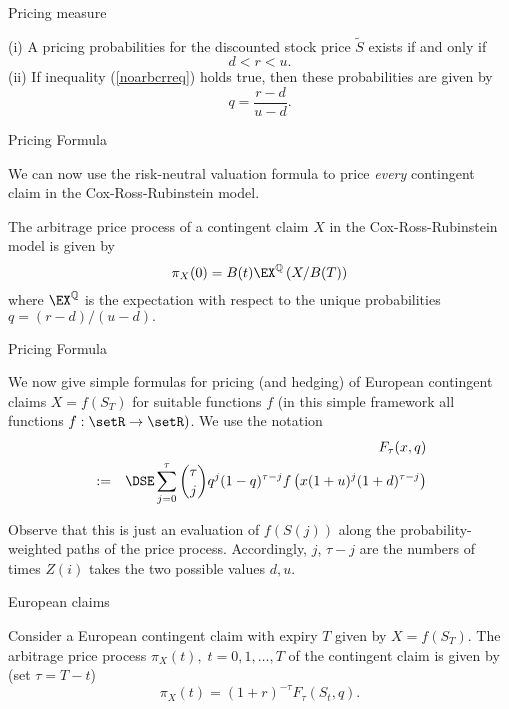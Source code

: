 {Pricing measure}

(i) A pricing probabilities for the discounted stock price
$\tilde{S}$ exists if and only if
\begin{equation}\label{noarbcrreq}
d < r < u.
\end{equation}
(ii) If inequality (\ref{noarbcrreq}) holds true, then these probabilities are given by
\begin{equation}\label{crrprob}
q=\frac{r-d}{u-d}.
\end{equation}

{Pricing Formula}

  \item We can now use the risk-neutral valuation formula to price {\it
every} contingent claim in the Cox-Ross-Rubinstein model.
  \item The arbitrage price process of a contingent claim $X$ in the
Cox-Ross-Rubinstein model is given by
$$
\pi_X(0) = B(t) \EX^\mathbb{Q}\left( X/B(T)\right)
$$
where $\EX^\mathbb{Q}$ is the expectation with respect to the
unique probabilities
$q= (r-d)/(u-d).$

{Pricing Formula}

  \item We now give simple formulas for pricing (and hedging) of European
contingent claims $X=f(S_T)$ for suitable functions $f$ (in this
simple framework all functions $f:\setR \rightarrow \setR)$. We
use the notation
\begin{eqnarray}\label{BinomialF}
&& F_\tau(x,q)\\\nonumber
&:=&\DSE \sum_{j=0}^\tau {\tau \choose j} q^j (1-q)^{\tau-j}
f\left(x(1+u)^j(1+d)^{\tau-j}\right)
\end{eqnarray}
\item Observe that this is just an evaluation of $f(S(j))$ along the
probability-weighted paths of the price process. Accordingly, $j$,
$\tau-j$ are the numbers of times $Z(i)$ takes the two possible
values $d, u$.

{European claims}
  \item Consider a European contingent claim with expiry $T$ given by
$X=f(S_T)$. The arbitrage price process $\pi_X(t), \; t=0, 1,
\ldots, T$ of the contingent claim is given by (set $\tau=T-t$)
\begin{equation}\label{crrcontclaimprice}
\pi_X(t) = (1+r)^{-\tau} F_\tau(S_t,q).
\end{equation}

